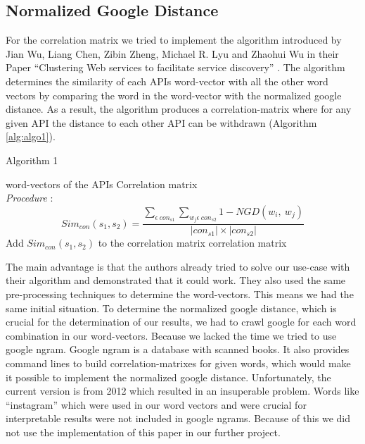 \documentclass[a4paper]{IEEEtran}
\begin{document}
\subsection{Normalized Google Distance}
For the correlation matrix we tried to implement the algorithm introduced by Jian Wu, Liang Chen, Zibin Zheng, Michael R. Lyu and Zhaohui Wu in their Paper “Clustering Web services to facilitate service discovery” \cite{kanungo2002efficient}. The algorithm determines the similarity of each APIs word-vector with all the other word vectors by comparing the word in the word-vector with the normalized google distance. As a result, the algorithm produces a correlation-matrix where for any given API the distance to each other API can be withdrawn (Algorithm \ref{alg:algo1}).

\begin{algorithm}[H]
 \caption{Algorithm 1}
 \begin{algorithmic}[1]
\renewcommand{\algorithmicrequire}{\textbf{Input:}}
 \renewcommand{\algorithmicensure}{\textbf{Output:}}
 \REQUIRE word-vectors of the APIs
 \ENSURE  Correlation matrix
 \\ \textit{Procedure} :
\STATE \begin{equation*}{Sim}_{con}\left(s_1,s_2\right)=\frac{\sum_{\epsilon\ {con}_{s1}}\sum_{w_j\epsilon\ {con}_{s2}}{1-NGD(w_i,\ w_j)}}{\left|{con}_{s1}\right|\times\left|{con}_{s2}\right|} \end{equation*}
 \STATE Add ${Sim}_{con}\left(s_1,s_2\right)$ to the correlation matrix 
\ENDFOR
\ENDFOR
\RETURN correlation matrix

 \end{algorithmic}
 \end{algorithm}


The main advantage is that the authors already tried to solve our use-case with their algorithm and demonstrated that it could work. They also used the same pre-processing techniques to determine the word-vectors. This means we had the same initial situation.
To determine the normalized google distance, which is crucial for the determination of our results, we had to crawl google for each word combination in our word-vectors. Because we lacked the time we tried to use google ngram. Google ngram is a database with scanned books. It also provides command lines to build correlation-matrixes for given words, which would make it possible to implement the normalized google distance. Unfortunately, the current version is from 2012 which resulted in an insuperable problem. Words like “instagram” which were used in our word vectors and were crucial for interpretable results were not included in google ngrams. Because of this we did not use the implementation of this paper in our further project.
\end{document}
